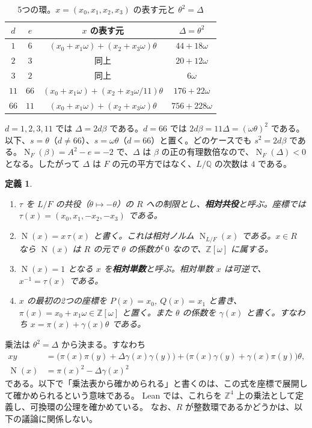 \documentclass[a4paper,11pt]{ltjsarticle}
\theoremstyle{jplain}
\newtheorem{definition}[theorem]{定義}
\numberwithin{equation}{section}
\numberwithin{table}{section}
\newcommand{\Z}{\mathbb{Z}}
\newcommand{\Q}{\mathbb{Q}}
\newcommand{\Nm}{\operatorname{N}}
\newcommand{\NF}{\operatorname{N}_F}
\begin{document}
\begin{table}[htbp]
\centering
\caption{5つの環。$x=(x_0,x_1,x_2,x_3)$ の表す元と $\theta^2=\Delta$}\label{tab:rings}
\begin{tabular}{cccc}
\toprule
$d$ & $e$ & $x$ の表す元 & $\Delta=\theta^2$\\
\midrule
$1$ & $6$ & $(x_0+x_1\omega)+(x_2+x_3\omega)\theta$ & $44+18\omega$\\
$2$ & $3$ & 同上 & $20+12\omega$\\
$3$ & $2$ & 同上 & $6\omega$\\
$11$ & $66$ & $(x_0+x_1\omega)+(x_2+x_3\omega/11)\theta$ & $176+22\omega$\\
$66$ & $11$ & $(x_0+x_1\omega)+(x_2+x_3\omega)\theta$ & $756+228\omega$\\
\bottomrule
\end{tabular}
\end{table}

$d=1,2,3,11$ では $\Delta=2d\beta$ である。$d=66$ では $2d\beta=11\Delta=(\omega\theta)^2$ である。
以下、$s=\theta$（$d\ne66$）、$s=\omega\theta$（$d=66$）と置く。どのケースでも $s^2=2d\beta$ である。$\NF(\beta)=A^2-e=-2$ で、$\Delta$ は $\beta$ の正の有理数倍なので、$\NF(\Delta)<0$ となる。したがって $\Delta$ は $F$ の元の平方ではなく、$L/\Q$ の次数は $4$ である。

\begin{definition}
\begin{enumerate}
\item $\tau$ を $L/F$ の共役（$\theta\mapsto-\theta$）の $R$ への制限とし、\textbf{相対共役}と呼ぶ。座標では $\tau(x)=(x_0,x_1,-x_2,-x_3)$ である。
\item $\Nm(x)=x\,\tau(x)$ と書く。これは相対ノルム $\Nm_{L/F}(x)$ である。$x\in R$ なら $\Nm(x)$ は $R$ の元で $\theta$ の係数が $0$ なので、$\Z[\omega]$ に属する。
\item $\Nm(x)=1$ となる $x$ を\textbf{相対単数}と呼ぶ。相対単数 $x$ は可逆で、$x^{-1}=\tau(x)$ である。
\item $x$ の最初の2つの座標を $P(x)=x_0$, $Q(x)=x_1$ と書き、$\pi(x)=x_0+x_1\omega\in\Z[\omega]$ と置く。また $\theta$ の係数を $\gamma(x)$ と書く。すなわち $x=\pi(x)+\gamma(x)\theta$ である。
\end{enumerate}
\end{definition}

乗法は $\theta^2=\Delta$ から決まる。すなわち
\begin{equation}\label{eq:mult}
\begin{aligned}
xy&=\bigl(\pi(x)\pi(y)+\Delta\gamma(x)\gamma(y)\bigr)+\bigl(\pi(x)\gamma(y)+\gamma(x)\pi(y)\bigr)\theta,\\
\Nm(x)&=\pi(x)^2-\Delta\gamma(x)^2
\end{aligned}
\end{equation}
である。以下で「乗法表から確かめられる」と書くのは、この式を座標で展開して確かめられるという意味である。
Lean では、これらを $\Z^4$ 上の乗法として定義し、可換環の公理を確かめている。
なお、$R$ が整数環であるかどうかは、以下の議論に関係しない。
\end{document}
